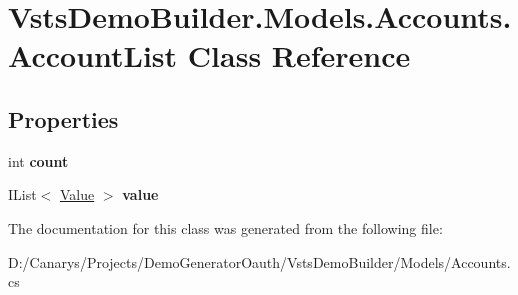 \hypertarget{class_vsts_demo_builder_1_1_models_1_1_accounts_1_1_account_list}{}\section{Vsts\+Demo\+Builder.\+Models.\+Accounts.\+Account\+List Class Reference}
\label{class_vsts_demo_builder_1_1_models_1_1_accounts_1_1_account_list}
\subsection*{Properties}
\begin{DoxyCompactItemize}
\item 
\mbox{\label{class_vsts_demo_builder_1_1_models_1_1_accounts_1_1_account_list_ab63c68247ebcf8bb05246680552cf7ed}} 
int {\bfseries count}
\item 
\mbox{\label{class_vsts_demo_builder_1_1_models_1_1_accounts_1_1_account_list_acd245a7b9929ba5e54f9e202b290bd6b}} 
I\+List$<$ \mbox{\hyperlink{class_vsts_demo_builder_1_1_models_1_1_accounts_1_1_value}{Value}} $>$ {\bfseries value}
\end{DoxyCompactItemize}


The documentation for this class was generated from the following file\+:\begin{DoxyCompactItemize}
\item 
D\+:/\+Canarys/\+Projects/\+Demo\+Generator\+Oauth/\+Vsts\+Demo\+Builder/\+Models/Accounts.\+cs\end{DoxyCompactItemize}

